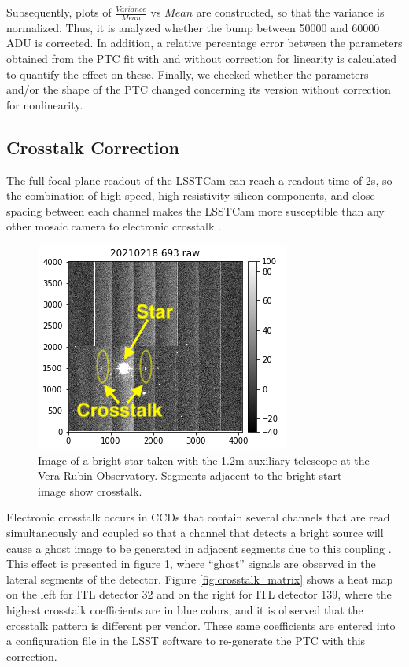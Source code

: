 Subsequently, plots of $\frac{Variance}{Mean}$ vs $Mean$ are constructed, so that the variance is normalized. Thus, it is analyzed whether the bump between 50000 and 60000 ADU is corrected. In addition, a relative percentage error between the parameters obtained from the PTC fit with and without correction for linearity is calculated to quantify the effect on these. Finally, we checked whether the parameters and/or the shape of the PTC changed concerning its version without correction for nonlinearity.


\subsection{Crosstalk Correction} \label{subsec:method_Crosstalk}

The full focal plane readout of the LSSTCam can reach a readout time of 2s, so the combination of high speed, high resistivity silicon components, and close spacing between each channel makes the LSSTCam more susceptible than any other mosaic camera to electronic crosstalk \citep{o2015crosstalk}.

\vspace{3mm}

\begin{figure}[!htb]
    \centering
    \includegraphics{Figures/Crosstalk_effect.png}
    \caption{Image of a bright star taken with the 1.2m auxiliary telescope at the Vera Rubin Observatory.  Segments adjacent to the bright start image show crosstalk.}
    \label{fig:crosstalk}
\end{figure}

Electronic crosstalk occurs in CCDs that contain several channels that are read simultaneously and coupled so that a channel that detects a bright source will cause a ghost image to be generated in adjacent segments due to this coupling \citep{snyder2020laboratory}. This effect is presented in figure \ref{fig:crosstalk}, where ``ghost'' signals are observed in the lateral segments of the detector. Figure \ref{fig:crosstalk_matrix} shows a heat map on the left for ITL detector 32 and on the right for ITL detector 139, where the highest crosstalk coefficients are in blue colors, and it is observed that the crosstalk pattern is different per vendor. These same coefficients are entered into a configuration file in the LSST software to re-generate the PTC with this correction.

